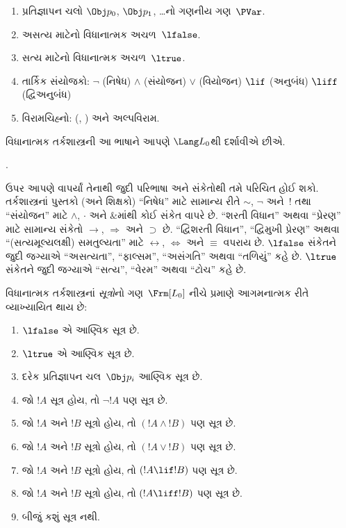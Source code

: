 \begin{enumerate}
\item પ્રતિજ્ઞાપન ચલો $\Obj p_0$, $\Obj p_1$, \dots નો
  ગણનીય ગણ~$\PVar$.
\item અસત્ય માટેનો વિધાનાત્મક અચળ~$\lfalse$.
\item સત્ય માટેનો વિધાનાત્મક અચળ~$\ltrue$.
\item તાર્કિક સંયોજકો:
  \startycommalist
  \ycomma $\lnot$ (નિષેધ)%
  \ycomma $\land$ (સંયોજન)%
  \ycomma $\lor$ (વિયોજન)%
  \ycomma $\lif$ (અનુબંધ)%
  \ycomma $\liff$ (દ્વિઅનુબંધ)%
\item વિરામચિહ્નો: (, ) અને અલ્પવિરામ.
\end{enumerate}

વિધાનાત્મક તર્કશાસ્ત્રની આ ભાષાને આપણે $\Lang L_0$થી દર્શાવીએ છીએ.

.




\begin{intro}
ઉપર આપણે વાપર્યાં તેનાથી જુદી પરિભાષા અને સંકેતોથી તમે પરિચિત હોઈ
શકો. તર્કશાસ્ત્રનાં પુસ્તકો (અને શિક્ષકો) ``નિષેધ'' માટે સામાન્ય રીતે
$\sim$, $\neg$ અને~!\; તથા ``સંયોજન'' માટે $\wedge$, $\cdot$ અને
$\&$માંથી કોઈ સંકેત વાપરે છે. ``શરતી વિધાન'' અથવા ``પ્રેરણ'' માટે
સામાન્ય સંકેતો $\rightarrow$, $\Rightarrow$ અને $\supset$ છે.
``દ્વિશરતી વિધાન'', ``દ્વિમુખી પ્રેરણ'' અથવા
  ``(સત્યમૂલ્યલક્ષી) સમતુલ્યતા'' માટે $\leftrightarrow$,
  $\Leftrightarrow$ અને $\equiv$ વપરાય છે.
$\lfalse$ સંકેતને જુદી જગ્યાએ ``અસત્યતા'',
  ``ફાલ્સમ'', ``અસંગતિ'' અથવા ``તળિયું'' કહે છે.
$\ltrue$ સંકેતને જુદી જગ્યાએ ``સત્ય'',
  ``વેરમ'' અથવા ``ટોચ'' કહે છે.
\end{intro}

\begin{defn}[સૂત્ર]
વિધાનાત્મક તર્કશાસ્ત્રનાં \emph{સૂત્રો}નો ગણ~$\Frm[L_0]$
નીચે પ્રમાણે આગમનાત્મક રીતે વ્યાખ્યાયિત થાય છે:
\begin{enumerate}
\item $\lfalse$ એ આણ્વિક સૂત્ર છે.

\item $\ltrue$ એ આણ્વિક સૂત્ર છે.

\item દરેક પ્રતિજ્ઞાપન ચલ~$\Obj p_i$ આણ્વિક
  સૂત્ર છે.

\item જો $!A$ સૂત્ર હોય, તો $\lnot !A$ પણ
  સૂત્ર છે.

\item જો $!A$ અને $!B$ સૂત્રો હોય, તો $(!A \land
  !B)$ પણ સૂત્ર છે.

\item જો $!A$ અને $!B$ સૂત્રો હોય, તો $(!A \lor !B)$
  પણ સૂત્ર છે.

\item જો $!A$ અને $!B$ સૂત્રો હોય, તો $(!A \lif !B)$
  પણ સૂત્ર છે.

\item જો $!A$ અને $!B$ સૂત્રો હોય, તો $(!A \liff !B)$
  પણ સૂત્ર છે.

\item બીજું કશું સૂત્ર નથી.
\end{enumerate}
\end{defn}

